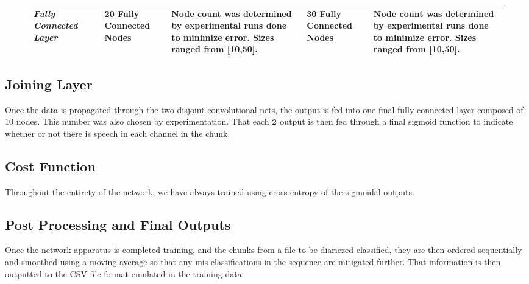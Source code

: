 \documentclass[11pt]{article}
\begin{document}
\begin{figure}[H]
\begin{adjustwidth}{-10cm}{}
\begin{table}[H]
\begin{tabular}{p{0.75in}l|p{0.65in}|p{1.5in}|p{0.65in}|p{1.5in}|}
\textit{Fully Connected Layer} &  & 20 Fully Connected Nodes                                             & Node count was determined by experimental runs done to minimize error.  Sizes ranged from [10,50].                                   & 30 Fully Connected Nodes                                             & Node count was determined by experimental runs done to minimize error.  Sizes ranged from [10,50].                                    \\ \hline
\end{tabular}
\end{table}
\end{adjustwidth}
\end{figure}

\subsection{Joining Layer}

Once the data is propagated through the two disjoint convolutional nets, the output is fed into one final fully connected layer composed of 10 nodes. This number was also chosen by experimentation. That each $2\time 1$ output is then fed through a final sigmoid function to indicate whether or not there is speech in each channel in the chunk.

\subsection{Cost Function}
Throughout the entirety of the network, we have always trained using cross entropy of the sigmoidal outputs.

\subsection{Post Processing and Final Outputs}


Once the network apparatus is completed training, and the chunks from a file to be diariezed classified, they are then ordered sequentially and smoothed using a moving average so that any mis-classifications in the sequence are mitigated further. That information is then outputted to the CSV file-format emulated in the training data.
\end{document}
